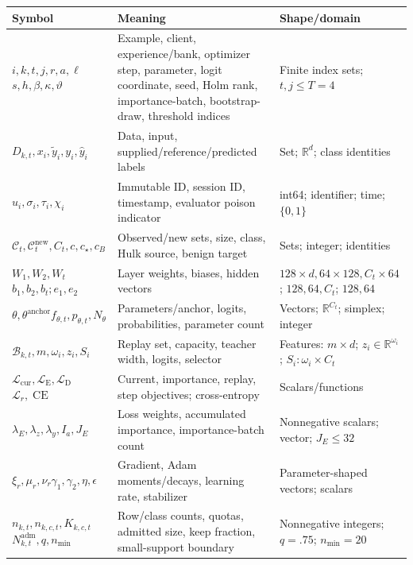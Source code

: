 \documentclass[10pt,a4paper]{article}
\newcommand{\CE}{\operatorname{CE}}
\begin{document}
\begin{longtable}{p{3.3cm}l p{4.4cm}}
\toprule
Symbol & Meaning & Shape/domain\\
\midrule
$i,k,t,j,r,a,\ell$\newline $s,h,\beta,\kappa,\vartheta$ & Example, client, experience/bank, optimizer step, parameter, logit coordinate, seed, Holm rank, importance-batch, bootstrap-draw, threshold indices & Finite index sets; $t,j\le T=4$\\
$D_{k,t},x_i,\widetilde y_i,y_i,\widehat y_i$ & Data, input, supplied/reference/predicted labels & Set; $\mathbb R^d$; class identities\\
$u_i,\sigma_i,\tau_i,\chi_i$ & Immutable ID, session ID, timestamp, evaluator poison indicator & int64; identifier; time; $\{0,1\}$\\
$\mathcal C_t,\mathcal C_t^{\mathrm{new}},C_t,c,c_\star,c_B$ & Observed/new sets, size, class, Hulk source, benign target & Sets; integer; identities\\
$W_1,W_2,W_t$\newline $b_1,b_2,b_t;e_1,e_2$ & Layer weights, biases, hidden vectors & $128\!\times\!d,64\!\times\!128,C_t\!\times\!64$; $128,64,C_t$; $128,64$\\
$\theta,\theta^{\mathrm{anchor}}$\newline $f_{\theta,t},p_{\theta,t},N_\theta$ & Parameters/anchor, logits, probabilities, parameter count & Vectors; $\mathbb R^{C_t}$; simplex; integer\\
$\mathcal B_{k,t},m,\omega_i,z_i,S_i$ & Replay set, capacity, teacher width, logits, selector & Features: $m\!\times\!d$; $z_i\in\mathbb R^{\omega_i}$; $S_i:\omega_i\!\times\!C_t$\\
$\mathcal L_{\mathrm{cur}},\mathcal L_{\mathrm{E}},\mathcal L_{\mathrm{D}}$\newline $\mathcal L_r,\CE$ & Current, importance, replay, step objectives; cross-entropy & Scalars/functions\\
$\lambda_E,\lambda_z,\lambda_y,I_a,J_E$ & Loss weights, accumulated importance, importance-batch count & Nonnegative scalars; vector; $J_E\le32$\\
$\xi_r,\mu_r,\nu_r$\newline $\gamma_1,\gamma_2,\eta,\epsilon$ & Gradient, Adam moments/decays, learning rate, stabilizer & Parameter-shaped vectors; scalars\\
$n_{k,t},n_{k,c,t},K_{k,c,t}$\newline $N^{\mathrm{adm}}_{k,t},q,n_{\min}$ & Row/class counts, quotas, admitted size, keep fraction, small-support boundary & Nonnegative integers; $q=.75$; $n_{\min}=20$\\

\end{longtable}
\end{document}
